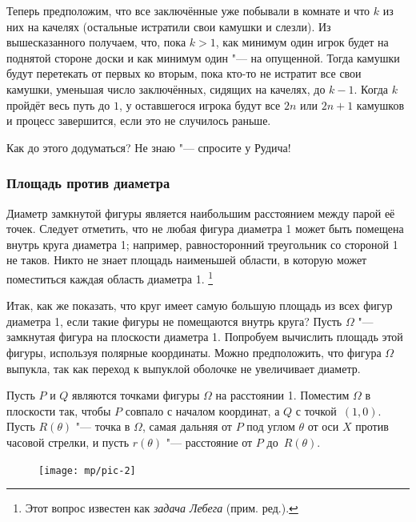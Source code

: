\documentclass[twoside]{book}
\begin{document}
Теперь предположим, что все заключённые уже побывали в комнате и что $k$ из них на качелях (остальные истратили свои камушки и слезли).
Из вышесказанного получаем, что, пока $k>1$, как минимум один игрок будет на поднятой стороне доски и как минимум один "--- на опущенной.
Тогда камушки будут перетекать от первых ко вторым, пока кто-то не истратит все свои камушки, уменьшая число заключённых, сидящих на качелях, до $k-1$.
Когда $k$ пройдёт весь путь до $1$, у оставшегося игрока будут все $2n$ или $2n+1$ камушков и процесс завершится, если это не случилось раньше.
\heart

Как до этого додуматься?
Не  знаю "--- спросите у Рудича!

\subsubsection*{Площадь против диаметра}


\medskip

Диаметр замкнутой фигуры является наибольшим расстоянием между парой её точек.
Следует отметить, что не любая фигура диаметра 1 может быть помещена внутрь круга диаметра 1;
например, равносторонний треугольник со стороной 1 не таков.
Никто не знает площадь наименьшей области, в которую может поместиться каждая область диаметра 1.%
\footnote{Этот вопрос известен как \emph{задача Лебега} (прим. ред.).}

Итак, как же показать, что круг имеет самую большую площадь из всех фигур диаметра 1, если такие фигуры не помещаются внутрь круга?
Пусть $\Omega$ "--- замкнутая фигура на плоскости диаметра 1.
Попробуем вычислить площадь этой фигуры, используя полярные координаты.
Можно предположить, что фигура $\Omega$ выпукла, так как переход к выпуклой оболочке не увеличивает диаметр.

Пусть $P$ и $Q$ являются точками фигуры $\Omega$ на расстоянии 1.
Поместим $\Omega$ в плоскости так, чтобы $P$ совпало с началом координат, а $Q$ с точкой~$(1,0)$.
Пусть $R(\theta)$ "--- точка в $\Omega$, самая дальняя от $P$ под углом $\theta$ от оси $X$ против часовой стрелки, и пусть $r(\theta)$ "--- расстояние от $P$ до~$R(\theta)$.


\begin{figure}
\vskip4mm
\centering
\texttt{[image: mp/pic-2]}
\end{figure}
\end{document}
